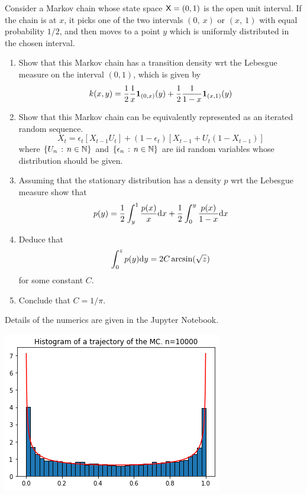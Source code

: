 \documentclass[english,graybox,envcountchap,envcountsame,sectrefs,shortlabels]{svmono}
\theoremstyle{style}
\begin{document}
\begin{exercise}
\label{exo:invar:two}
Consider a Markov chain whose state space $\mathsf{X}=(0,1)$ is the open
unit interval. If the chain is at $x$, it picks one of the two intervals
$(0,\ x)$ or $(x,\ 1)$ with equal probability $1/2$, and then moves
to a point $y$ which is uniformly distributed in the chosen interval.
\begin{enumerate}
\item Show that this Markov chain has a transition density wrt the Lebesgue
measure on the interval $(0,1)$, which is given by
\[
k(x,y)=\frac{1}{2}\frac{1}{x}\mathbf{1}_{(0,x)}(y)+\frac{1}{2}\frac{1}{1-x}\mathbf{1}_{(x,1)}(y)
\]

\item Show that this Markov chain can be equivalently represented as an
iterated random sequence.
\[
X_{t}=\epsilon_{t}\left[X_{t-1}U_{t}\right]+(1-\epsilon_{t})\left[X_{t-1}+U_{t}(1-X_{t-1})\right]
\]
 where $\left\{ U_{n}\,:\,n\in\mathbb{N}\right\}$ and $\left\{ \epsilon_{n}\,:\,n\in\mathbb{N}\right\}$
are iid random variables whose distribution should be given.
\item Assuming that the stationary distribution has a density $p$ wrt the
Lebesgue measure show that
\[
p(y)=\frac{1}{2}\int_{y}^{1}\frac{p(x)}{x}\mathrm{d} x+\frac{1}{2}\int_{0}^{y}\frac{p(x)}{1-x}\mathrm{d} x
\]

\item Deduce that
\[
\int_{0}^{z}p(y)\mathrm{d} y=2C\,\mathrm{arcsin}(\sqrt{z})
\]
for some constant $C$.
\item Conclude that $C=1/\pi$.
\end{enumerate}
Details of the numerics are given in the Jupyter Notebook.

\begin{center}

\includegraphics[scale=0.5]{exercise3}

\end{center}
\end{exercise}
\end{document}
